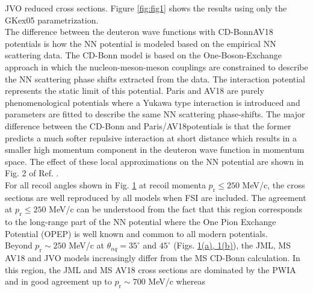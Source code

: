 JVO reduced cross sections. Figure \ref{fig:fig1} shows the results using only the GKex05 parametrization. \\
\indent The difference between the deuteron wave functions with CD-Bonn\DIFdelbegin {}\DIFdelend \DIFaddbegin {}\DIFaddend AV18 \DIFaddbegin {}\DIFaddend potentials is 
how the NN potential is modeled based on the empirical NN scattering data.
The CD-Bonn model is based on the One-Boson-Exchange \DIFaddbegin {}\DIFaddend approach in which the 
nucleon-meson-meson couplings are constrained to describe the NN scattering phase shifts
extracted from the data. The interaction potential represents the static limit of 
this potential. \DIFaddbegin {}\DIFaddend Paris and AV18 are purely phenomenological potentials where a 
Yukawa type interaction is introduced and parameters are fitted to describe the 
same NN scattering phase-shifts. The major difference between the CD-Bonn and Paris/AV18\DIFaddbegin {}\DIFaddend potentials is that the former predicts a much softer repulsive interaction at short distance which 
results in a smaller high momentum component in the deuteron wave function in momentum space.
The effect of these local approximations on the NN potential are shown in Fig. 2 of Ref. \cite{PhysRevC.63.024001}.\\
\indent For all recoil angles shown in Fig. \hyperref[fig:fig1]{1} at recoil momenta $p_{\mathrm{r}}\leq250$ MeV/c, the cross sections are well reproduced by all models when FSI are included.
The agreement at $p_{\mathrm{r}}\leq250$ MeV/c can be understood from the fact that this region corresponds to the long-range part of the NN potential where the One Pion Exchange Potential (OPEP)
is well known and common to all modern potentials. \\
\indent Beyond $p_{\mathrm{r}}\sim250$ MeV/c at $\theta_{nq}=35^{\circ}$ and $45^{\circ}$ (Figs. \hyperref[fig:fig1]{1(a), 1(b)}), the JML,
MS AV18 and JVO models increasingly differ from the MS CD-Bonn calculation. In this region, the JML and MS AV18 cross sections are dominated by the PWIA and in good agreement up to $p_{\mathrm{r}}\sim700$ MeV/c whereas
